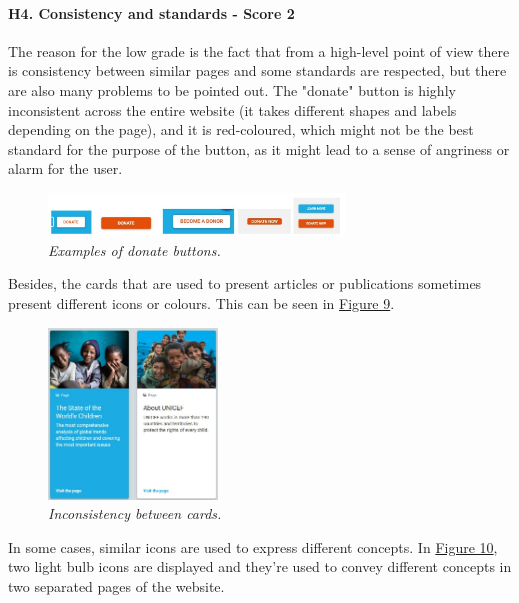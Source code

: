 \paragraph{H4. Consistency and standards - Score 2} \label{subsec:H4}	The reason for the low grade is the fact that from a high-level point of view there is consistency between similar pages and some standards are respected, but there are also many problems to be pointed out.
\newline The "donate" button is highly inconsistent across the entire website (it takes different shapes and labels depending on the page), and it is red-coloured, which might not be the best standard for the purpose of the button, as it might lead to a sense of angriness or alarm for the user.
\begin{figure}[!h]
	\begin{center}
		\includegraphics[width=0.7\textwidth]{FinalScores8.jpg}
		\captionsetup{font=small}
		\caption{\textit{Examples of donate buttons.}}
	\end{center}
\end{figure}
\newline Besides, the cards that are used to present articles or publications sometimes present different icons or colours. This can be seen in \hyperref[fig:cards]{Figure 9}.
\begin{figure}[!h]
	\label{fig:cards}
	\begin{center}
		\includegraphics[width=0.4\textwidth]{FinalScores9.jpg}
		\captionsetup{font=small}
		\caption{\textit{Inconsistency between cards.}}
	\end{center}
\end{figure}

In some cases, similar icons are used to express different concepts. In \hyperref[fig:fig10]{Figure 10}, two light bulb icons are displayed and they're used to convey different concepts in two separated pages of the website.


